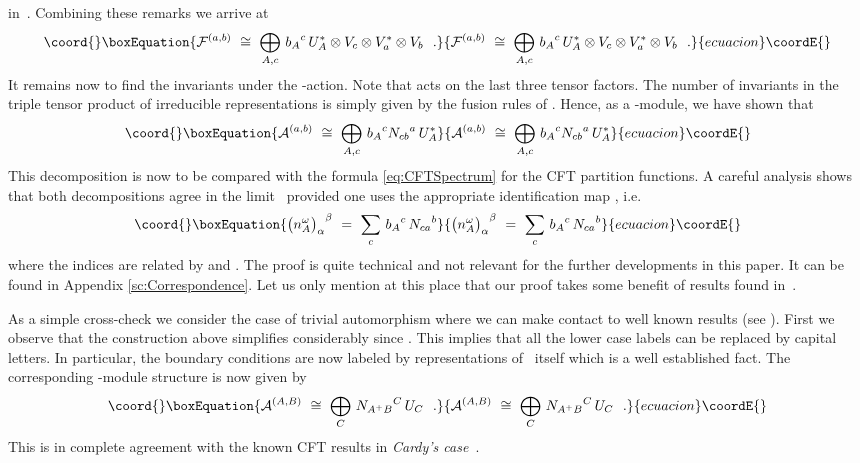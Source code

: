 \documentclass[12pt,a4paper]{article}
\providecommand{\mc}{\mathcal} %
\def\Iso{\Psi}
\def\iG{G^\omega} %
\def\id{{\rm id}}
\begin{document}
in~\coordHE{}. Combining these remarks we arrive at 
\begin{equation*}\coord{}\boxEquation{
  \mc{F}^{(a,b)}
  \ \cong\  \bigoplus_{A,c}\, {b_A}^c\, U_A^\ast
   \otimes V_c\otimes V_a^\ast\otimes V_b \ \ . 
}{
  \mc{F}^{(a,b)}
  \ \cong\  \bigoplus_{A,c}\, {b_A}^c\, U_A^\ast
   \otimes V_c\otimes V_a^\ast\otimes V_b \ \ . 
}{ecuacion}\coordE{}\end{equation*}
It remains now to find the invariants under the \myHighlight{$\iG$}\coordHE{}-action. 
Note that \myHighlight{$\iG$}\coordHE{} acts on the last three tensor factors. The 
number of invariants in the triple tensor product of irreducible 
representations is simply given by the fusion rules \coordHE{} 
of \myHighlight{$\iG$}\coordHE{}. Hence, as a \coordHE{}-module, we have shown that  
\begin{equation*}\coord{}\boxEquation{
  \mc{A}^{(a,b)}
  \ \cong \ \bigoplus_{A,c}\, {b_A}^c{N_{cb}}^a\, U_A^\ast
}{
  \mc{A}^{(a,b)}
  \ \cong \ \bigoplus_{A,c}\, {b_A}^c{N_{cb}}^a\, U_A^\ast
}{ecuacion}\coordE{}\end{equation*}
This decomposition is now to be compared with the formula 
\eqref{eq:CFTSpectrum} for the CFT partition functions.
A careful analysis shows that both decompositions agree 
in the limit~\coordHE{} provided one uses the appropriate 
identification map \myHighlight{$\Iso$}\coordHE{}, i.e.\ 
\begin{equation}\coord{}\boxEquation{ \label{magform} 
  {\bigl(n_A^\omega\bigr)_\alpha}^\beta
  \ = \ \sum_{c}\, {b_{A}}^c\, {N_{ca}}^b
}{ {\bigl(n_A^\omega\bigr)_\alpha}^\beta
  \ = \ \sum_{c}\, {b_{A}}^c\, {N_{ca}}^b
}{ecuacion}\coordE{}\end{equation} 
where the indices are related by \myHighlight{$\alpha=\Iso(a)$}\coordHE{} and
\myHighlight{$\beta=\Iso(b)$}\coordHE{}.
The proof is quite technical and not relevant for the further 
developments in this paper. It can be found in Appendix 
\ref{sc:Correspondence}. Let us only mention at this 
place that our proof takes some benefit of results found
in~\cite{Quella:2001wh,Quella:2002wi}.
\smallskip

As a simple cross-check we consider the case of trivial automorphism
\myHighlight{$\omega=\id$}\coordHE{} where we can make contact to well known results (see  
\cite{Alekseev:1999bs}). First we observe that the construction 
above simplifies considerably since \myHighlight{$\iG \cong G$}\coordHE{}. This implies 
that all the lower case labels can be replaced by capital letters.
In particular, the boundary conditions are now labeled by 
representations of~\coordHE{} itself which is a well established fact. 
The corresponding \myHighlight{$G$}\coordHE{}-module structure is now given by
\begin{equation*}\coord{}\boxEquation{
  \mc{A}^{(A,B)}
  \ \cong \ \bigoplus_C \, {N_{A^+B}}^{C} \, U_{C}\ \ .
}{
  \mc{A}^{(A,B)}
  \ \cong \ \bigoplus_C \, {N_{A^+B}}^{C} \, U_{C}\ \ .
}{ecuacion}\coordE{}\end{equation*}
This is in complete agreement with the known CFT results in
{\em Cardy's case}~\cite{Cardy:1989ir}.%
\medskip%
\end{document}
